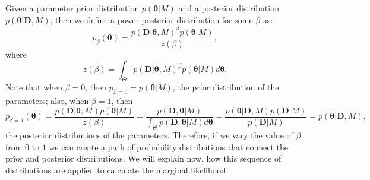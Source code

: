 Given a parameter prior distribution $p ({\bm \theta} | M)$ and a 
posterior distribution $p ({\bm \theta} | {\bm D}, M)$, then we define a
power posterior distribution for some $\beta$ as:
\begin{equation}
    p_{\beta} ({\bm \theta}) = 
        \frac{p ({\bm D} | {\bm \theta}, M)^\beta p({\bm \theta} | M)}
                              {z (\beta)},
\label{eq:power_posterior}
\end{equation}
where
\begin{equation}
    z (\beta) = 
        \int_\Theta p ({\bm D} | {\bm \theta}, M)^\beta 
        p({\bm \theta} | M) d{\bm \theta}.
\end{equation}
Note that when $\beta = 0$, then $p_{\beta=0} = p ({\bm \theta} | M)$, 
the prior distribution of the parameters; also, when $\beta = 1$, then
\begin{equation}
    p_{\beta=1}({\bm \theta}) = 
        \frac{p ({\bm D} | {\bm \theta}, M) p({\bm \theta} | M)}
             {z (\beta)}
                        =
        \frac{p ({\bm D}, {\bm \theta} | M)}
             {\int_\Theta p ({\bm D}, {\bm \theta} | M)d{\bm \theta}}
                        =
        \frac{p({\bm \theta} | {\bm D}, M) p({\bm D} | M)}
             {p ({\bm D} | M)}
                        =
        p ({\bm \theta} | {\bm D}, M),
\end{equation}
the posterior distributions of the parameters. Therefore, if we vary the
value of $\beta$ from $0$ to $1$ we can create a path of probability 
distributions that connect the prior and posterior distributions. We
will explain now, how this sequence of distributions are applied to
calculate the marginal likelihood.

